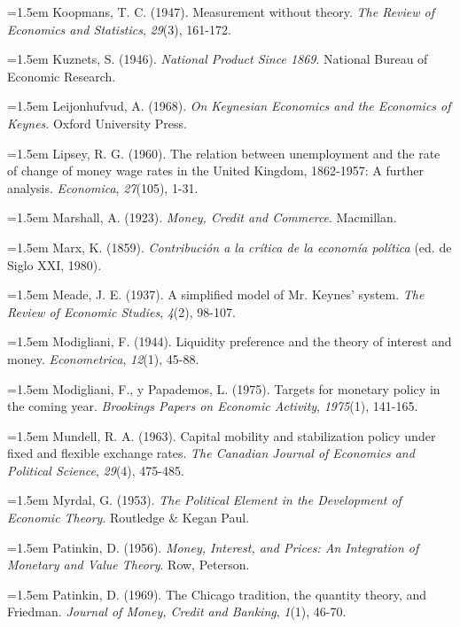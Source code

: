 \documentclass[10pt,a4paper]{article}
\begin{document}
\noindent\hangindent=1.5em Koopmans, T. C. (1947). Measurement without theory. \textit{The Review of Economics and Statistics}, \textit{29}(3), 161-172.

\noindent\hangindent=1.5em Kuznets, S. (1946). \textit{National Product Since 1869}. National Bureau of Economic Research.

\noindent\hangindent=1.5em Leijonhufvud, A. (1968). \textit{On Keynesian Economics and the Economics of Keynes}. Oxford University Press.

\noindent\hangindent=1.5em Lipsey, R. G. (1960). The relation between unemployment and the rate of change of money wage rates in the United Kingdom, 1862-1957: A further analysis. \textit{Economica}, \textit{27}(105), 1-31.

\noindent\hangindent=1.5em Marshall, A. (1923). \textit{Money, Credit and Commerce}. Macmillan.

\noindent\hangindent=1.5em Marx, K. (1859). \textit{Contribución a la crítica de la economía política} (ed. de Siglo XXI, 1980).

\noindent\hangindent=1.5em Meade, J. E. (1937). A simplified model of Mr. Keynes' system. \textit{The Review of Economic Studies}, \textit{4}(2), 98-107.

\noindent\hangindent=1.5em Modigliani, F. (1944). Liquidity preference and the theory of interest and money. \textit{Econometrica}, \textit{12}(1), 45-88.

\noindent\hangindent=1.5em Modigliani, F., y Papademos, L. (1975). Targets for monetary policy in the coming year. \textit{Brookings Papers on Economic Activity}, \textit{1975}(1), 141-165.

\noindent\hangindent=1.5em Mundell, R. A. (1963). Capital mobility and stabilization policy under fixed and flexible exchange rates. \textit{The Canadian Journal of Economics and Political Science}, \textit{29}(4), 475-485.

\noindent\hangindent=1.5em Myrdal, G. (1953). \textit{The Political Element in the Development of Economic Theory}. Routledge \& Kegan Paul.

\noindent\hangindent=1.5em Patinkin, D. (1956). \textit{Money, Interest, and Prices: An Integration of Monetary and Value Theory}. Row, Peterson.

\noindent\hangindent=1.5em Patinkin, D. (1969). The Chicago tradition, the quantity theory, and Friedman. \textit{Journal of Money, Credit and Banking}, \textit{1}(1), 46-70.
\end{document}
